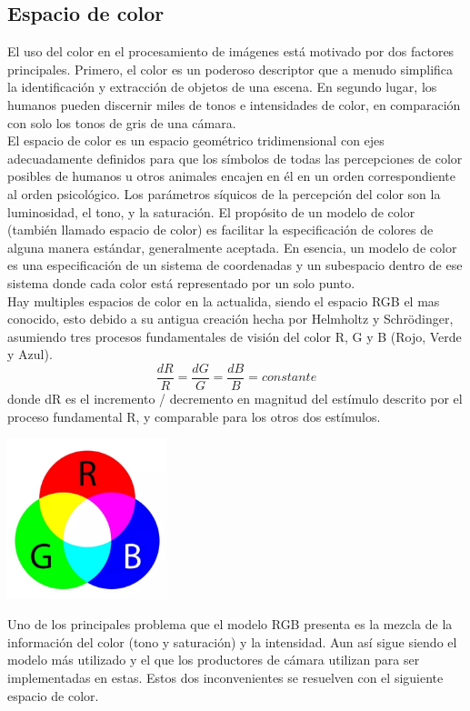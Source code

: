 \subsection{Espacio de color}
El uso del color en el procesamiento de imágenes está motivado por dos factores principales.
Primero, el color es un poderoso descriptor que a menudo simplifica la identificación y
extracción de objetos de una escena. En segundo lugar, los humanos pueden discernir miles
de tonos e intensidades de color, en comparación con solo los tonos de gris de una cámara.\cite{Book:Rafael2002}\\
El espacio de color es un espacio geométrico tridimensional con ejes adecuadamente
definidos para que los símbolos de todas las percepciones de color posibles de humanos u
otros animales encajen en él en un orden correspondiente al orden psicológico.
Los parámetros síquicos de la percepción del color son la luminosidad, el tono, y
la saturación. El propósito de un modelo de color (también llamado espacio de color) es
facilitar la especificación de colores de alguna manera estándar, generalmente aceptada.
En esencia, un modelo de color es una especificación de un sistema de coordenadas y un
subespacio dentro de ese sistema donde cada color está representado por un solo punto.\\
Hay multiples espacios de color en la actualida, siendo el espacio RGB el mas conocido, esto
debido a su antigua creación hecha por Helmholtz y Schrödinger, asumiendo
tres procesos fundamentales de visión del color R, G y B (Rojo, Verde y Azul).
\begin{equation}
	\frac{dR}{R} = \frac{dG}{G} = \frac{dB}{B} = constante
\end{equation}
donde dR es el incremento / decremento en magnitud del estímulo descrito por el proceso
fundamental R, y comparable para los otros dos estímulos.\cite{Book:Rolf2003}
\begin{center}
	\includegraphics[width=0.35\textwidth]{Contenido/Cuerpo/Capitulo2/Fig10.eps}
	\label{fig:MarcoTeorico:Fig20}
\end{center}
Uno de los principales problema que el modelo RGB presenta es la mezcla de la información
del color (tono y saturación) y la intensidad. Aun así sigue siendo el modelo más utilizado y
el que los productores de cámara utilizan para ser implementadas en estas. Estos dos inconvenientes
se resuelven con el siguiente espacio de color.
